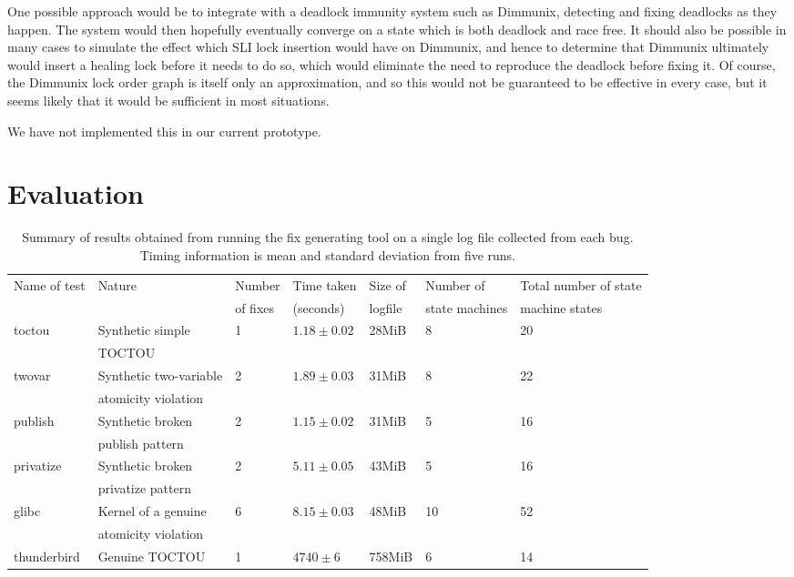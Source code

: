 \documentclass[10pt,twocolumn,preprint,natbib,authoryear]{sigplanconf}
\begin{document}
One possible approach would be to integrate with a deadlock immunity
system such as Dimmunix\cite{Jula2008}, detecting and fixing deadlocks
as they happen.  The system would then hopefully eventually converge
on a state which is both deadlock and race free.  It should also be
possible in many cases to simulate the effect which SLI lock insertion
would have on Dimmunix, and hence to determine that Dimmunix
ultimately would insert a healing lock before it needs to do so, which
would eliminate the need to reproduce the deadlock before fixing it.
Of course, the Dimmunix lock order graph is itself only an
approximation, and so this would not be guaranteed to be effective in
every case, but it seems likely that it would be sufficient in most
situations.

We have not implemented this in our current prototype.

\section{Evaluation}
\label{sect:evaluation}

\begin{table*}
\begin{tabular}{lllllll}
Name of test & Nature & Number & Time taken & Size of & Number of & Total number of state\\
 & & of fixes & (seconds) & logfile & state machines & machine states\\
\hline
toctou & Synthetic simple & 1 & $1.18 \pm 0.02$ & 28MiB & 8 & 20\\
       & TOCTOU & & & \\
twovar & Synthetic two-variable & 2 & $1.89 \pm 0.03$ & 31MiB & 8 & 22\\
       & atomicity violation &&&\\
publish & Synthetic broken & 2 & $1.15 \pm 0.02$ & 31MiB & 5 & 16 \\
        & publish pattern & & & \\
privatize & Synthetic broken & 2 & $5.11 \pm 0.05$ & 43MiB & 5 & 16 \\
          & privatize pattern & & & \\
\hline
glibc & Kernel of a genuine & 6 & $8.15 \pm 0.03$ & 48MiB & 10 & 52\\
      & atomicity violation & & & \\
\hline
thunderbird & Genuine TOCTOU & 1 & $4740 \pm 6$ & 758MiB & 6 & 14
\end{tabular}
\caption{Summary of results obtained from running the fix generating
  tool on a single log file collected from each bug.  Timing
  information is mean and standard deviation from five runs.}
\label{tab:perf_summary}
\end{table*}
\end{document}
